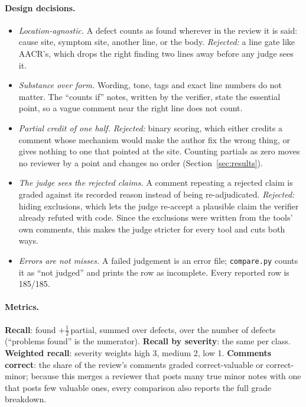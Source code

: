 \documentclass[11pt,a4paper]{article}
\newcommand{\code}[1]{\texttt{#1}}
\begin{document}
\paragraph{Design decisions.}
\begin{itemize}
  \item \emph{Location-agnostic.} A defect counts as found wherever in the
  review it is said: cause site, symptom site, another line, or the body.
  \emph{Rejected:} a line gate like AACR's, which drops the right finding two
  lines away before any judge sees it.
  \item \emph{Substance over form.} Wording, tone, tags and exact line
  numbers do not matter. The ``counts if'' notes, written by the verifier,
  state the essential point, so a vague comment near the right line does not
  count.
  \item \emph{Partial credit of one half.} \emph{Rejected:} binary scoring,
  which either credits a comment whose mechanism would make the author fix
  the wrong thing, or gives nothing to one that pointed at the site. Counting
  partials as zero moves no reviewer by a point and changes no order
  (Section~\ref{sec:results}).
  \item \emph{The judge sees the rejected claims.} A comment repeating a
  rejected claim is graded against its recorded reason instead of being
  re-adjudicated. \emph{Rejected:} hiding exclusions, which lets the judge
  re-accept a plausible claim the verifier already refuted with code. Since
  the exclusions were written from the tools' own comments, this makes the
  judge stricter for every tool and cuts both ways.
  \item \emph{Errors are not misses.} A failed judgement is an error file;
  \code{compare.py} counts it as ``not judged'' and prints the row as
  incomplete. Every reported row is 185/185.
\end{itemize}

\paragraph{Metrics.} \textbf{Recall}: found $+\tfrac12\,$partial, summed over
defects, over the number of defects (``problems found'' is the numerator).
\textbf{Recall by severity}: the same per class. \textbf{Weighted recall}:
severity weights high 3, medium 2, low 1. \textbf{Comments correct}: the
share of the review's comments graded correct-valuable or correct-minor;
because this merges a reviewer that posts many true minor notes with one
that posts few valuable ones, every comparison also reports the full grade
breakdown.
\end{document}
